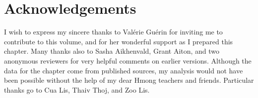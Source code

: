 \documentclass[output=paper]{LSP/langsci}
\begin{document}
\section*{Acknowledgements}
I wish to express my sincere thanks to Valérie Guérin for inviting me to contribute to
this volume, and for her wonderful support as I prepared this chapter. Many thanks
also to Sasha Aikhenvald, Grant Aiton, and two anonymous reviewers for very helpful
comments on earlier versions. Although the data for the chapter come from published
sources, my analysis would not have been possible without the help of my dear Hmong
teachers and friends. Particular thanks go to Cua Lis, Thaiv Thoj, and Zoo Lis.

\sloppy

\printbibliography[heading=subbibliography,notkeyword=this] 
\end{document}
